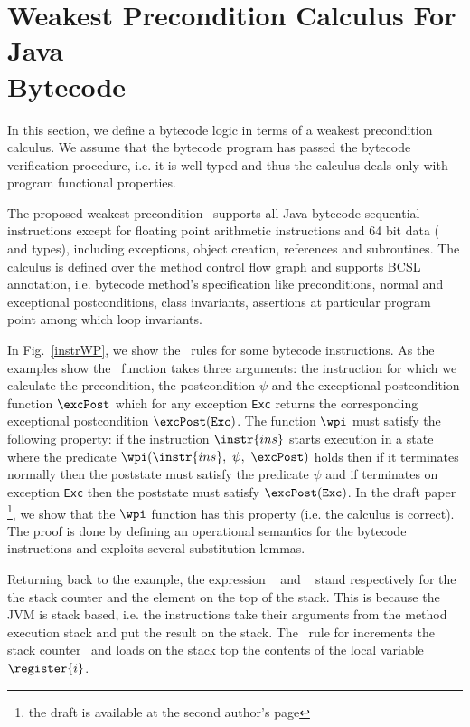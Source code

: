 
\section{Weakest Precondition Calculus For Java \\  Bytecode}\label{wpbc}
In this section, we define a bytecode logic in terms of a weakest precondition calculus.
We assume that the bytecode program has passed the bytecode verification procedure, i.e. it is well typed and
 thus the calculus deals only with program functional properties. 

The proposed weakest precondition \wpi \ supports all Java bytecode sequential instructions except for floating point
 arithmetic instructions and 64 bit data ( and  types), including exceptions, object creation,
 references and subroutines. The calculus is defined over the method control flow graph and supports BCSL annotation,
 i.e. bytecode method's specification like preconditions, normal and exceptional postconditions, class invariants,
 assertions at particular program point among which loop invariants.

 In Fig.~\ref{instrWP}, we show the \wpi \ rules for some bytecode instructions. 
As the examples show the \wpi \ function takes three arguments:
the instruction for which we calculate the precondition, 
the postcondition $\psi$ and the exceptional postcondition function $\excPost$ which for any exception \texttt{Exc} returns the
corresponding exceptional postcondition $\excPost(\texttt{Exc})$. 
The function $\wpi$ must satisfy the following property: if the instruction $\instr{ins}$ starts execution in a state where the predicate
$\wpi(\instr{ins}, \ \psi, \ \excPost)$ holds then if it terminates normally then the poststate must satisfy the predicate $\psi$  
and if terminates on exception \texttt{Exc} then  the poststate must satisfy $\excPost(\texttt{Exc})$.
 In the draft paper \cite{JBL05MP}\footnote{the draft is available at the second author's page},
 we show that the $\wpi$ function has this property (i.e. the calculus is correct). The proof is done by defining an operational semantics for the bytecode instructions and
 exploits several substitution lemmas.

Returning back to the example, the expression \counter~ and  \stack{\counter}~ stand respectively for the the stack counter and the element on the top of the stack.
 This is because the JVM is stack based, i.e. the instructions take their arguments from the method execution stack and 
 put the result on the stack.
 The \wpi \ rule for   increments the stack counter \counter \ and loads on the stack top the contents
 of the local variable $\register{i}$. 

